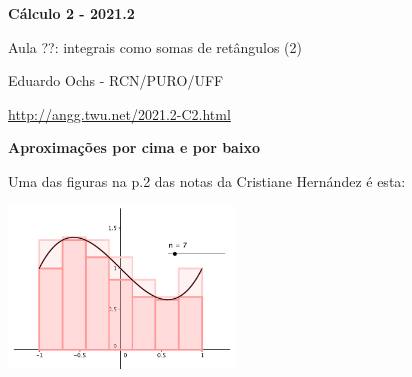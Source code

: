 \documentclass[oneside,12pt]{article}
\begin{document}
\def\Intxover     #1#2#3{\overline {∫}_{x=#1}^{x=#2}#3\,dx}
\def\Intxunder    #1#2#3{\underline{∫}_{x=#1}^{x=#2}#3\,dx}

\def\Intoverunder   #1#2{\overline{\underline{∫}}_{#1}      #2\,dx}
\def\Intxoverunder#1#2#3{\overline{\underline{∫}}_{x=#1}^{x=#2} #3\,dx}


%

\thispagestyle{empty}

\begin{center}

\vspace*{1.2cm}

{\bf \Large Cálculo 2 - 2021.2}

\bsk

Aula ??: integrais como somas de retângulos (2)

\bsk

Eduardo Ochs - RCN/PURO/UFF

\url{http://angg.twu.net/2021.2-C2.html}

\end{center}

\newpage


{\bf Aproximações por cima e por baixo}

Uma das figuras na p.2 das notas da Cristiane Hernández é esta:


\includegraphics[width=6cm]{2020-1-C2/area-hernandez-1.png}
\end{document}
